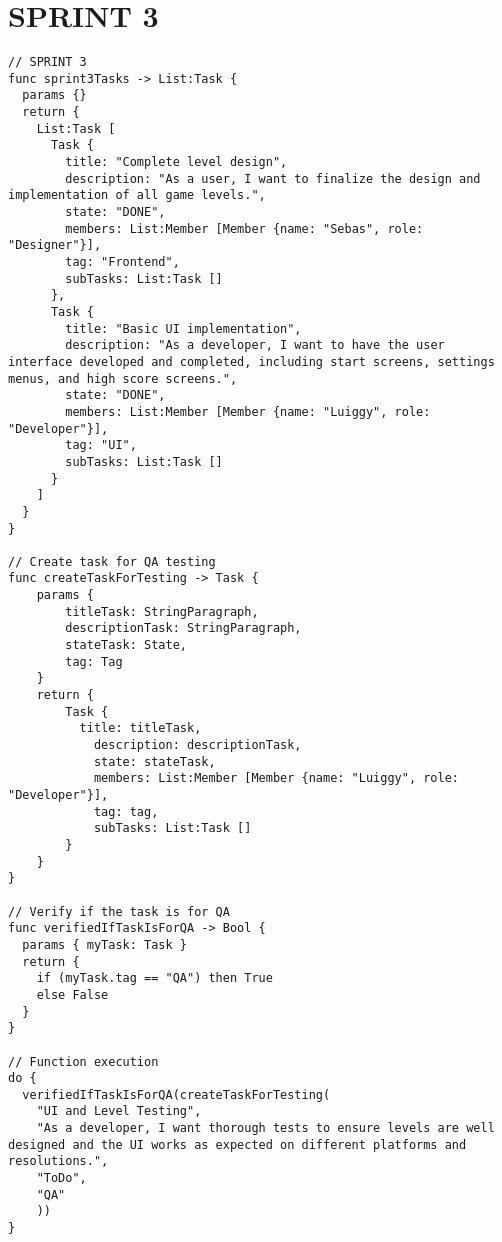 \documentclass{article}
\begin{document}
\section{SPRINT 3}
\begin{verbatim}
// SPRINT 3
func sprint3Tasks -> List:Task {
  params {}
  return {
    List:Task [
      Task {
        title: "Complete level design",
        description: "As a user, I want to finalize the design and implementation of all game levels.",
        state: "DONE",
        members: List:Member [Member {name: "Sebas", role: "Designer"}],
        tag: "Frontend",
        subTasks: List:Task []
      },
      Task {
        title: "Basic UI implementation",
        description: "As a developer, I want to have the user interface developed and completed, including start screens, settings menus, and high score screens.",
        state: "DONE",
        members: List:Member [Member {name: "Luiggy", role: "Developer"}],
        tag: "UI",
        subTasks: List:Task []
      }
    ]
  }
}

// Create task for QA testing
func createTaskForTesting -> Task {
    params {
        titleTask: StringParagraph,
        descriptionTask: StringParagraph,
        stateTask: State,
        tag: Tag
    }
    return {
        Task {
          title: titleTask,
	        description: descriptionTask,
	        state: stateTask,
	        members: List:Member [Member {name: "Luiggy", role: "Developer"}],
	        tag: tag,
	        subTasks: List:Task []
        }
    }
}

// Verify if the task is for QA
func verifiedIfTaskIsForQA -> Bool {
  params { myTask: Task }
  return {
    if (myTask.tag == "QA") then True
    else False
  }
}

// Function execution
do {
  verifiedIfTaskIsForQA(createTaskForTesting(
    "UI and Level Testing", 
    "As a developer, I want thorough tests to ensure levels are well designed and the UI works as expected on different platforms and resolutions.", 
    "ToDo", 
    "QA"
    ))
}
\end{verbatim}
\end{document}
